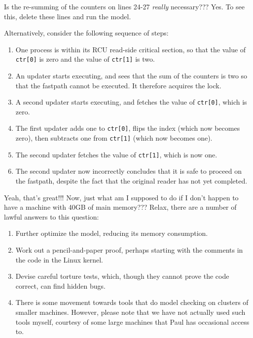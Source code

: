\QuickQ{}
	Is the re-summing of the counters on lines 24-27
	\emph{really} necessary???
\QuickA{}
	Yes.  To see this, delete these lines and run the model.

	Alternatively, consider the following sequence of steps:

	\begin{enumerate}
	\item	One process is within its RCU read-side critical
		section, so that the value of {\tt ctr[0]} is zero and
		the value of {\tt ctr[1]} is two.
	\item	An updater starts executing, and sees that the sum of
		the counters is two so that the fastpath cannot be
		executed.  It therefore acquires the lock.
	\item	A second updater starts executing, and fetches the value
		of {\tt ctr[0]}, which is zero.
	\item	The first updater adds one to {\tt ctr[0]}, flips
		the index (which now becomes zero), then subtracts
		one from {\tt ctr[1]} (which now becomes one).
	\item	The second updater fetches the value of {\tt ctr[1]},
		which is now one.
	\item	The second updater now incorrectly concludes that it
		is safe to proceed on the fastpath, despite the fact
		that the original reader has not yet completed.
	\end{enumerate}

\QuickQ{}
	Yeah, that's great!!!
	Now, just what am I supposed to do if I don't happen to have a
	machine with 40GB of main memory???
\QuickA{}
	Relax, there are a number of lawful answers to
	this question:
	\begin{enumerate}
	\item	Further optimize the model, reducing its memory consumption.
	\item	Work out a pencil-and-paper proof, perhaps starting with the
		comments in the code in the Linux kernel.
	\item	Devise careful torture tests, which, though they cannot prove
		the code correct, can find hidden bugs.
	\item	There is some movement towards tools that do model
		checking on clusters of smaller machines.
		However, please note that we have not actually used such
		tools myself, courtesy of some large machines that Paul has
		occasional access to.
	\end{enumerate}

